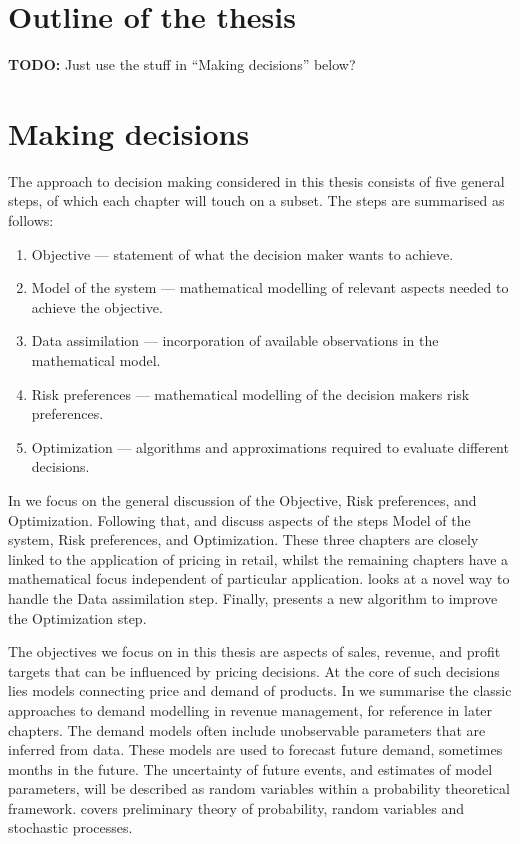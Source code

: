 \documentclass[main.tex]{subfiles}
\begin{document}
\section{Outline of the thesis}
\textbf{TODO:} Just use the stuff in ``Making decisions'' below?

\section{Making decisions}
The approach to decision making considered in this thesis consists of
five general steps, of which each chapter will touch on a subset.
The steps are summarised as follows:
\begin{enumerate}
\item Objective --- statement of what the decision maker wants to achieve.
\item Model of the system --- mathematical modelling of relevant aspects
  needed to achieve the objective.
\item Data assimilation --- incorporation of available observations in
  the mathematical model.
\item Risk preferences --- mathematical modelling of the decision makers risk
  preferences.
\item Optimization --- algorithms and approximations required to
  evaluate different decisions.
\end{enumerate}
In  we focus on the general discussion of the
Objective, Risk preferences, and Optimization.
Following that,  and
 discuss  aspects of the steps Model of the system, Risk
preferences, and Optimization.
These three chapters are closely linked to the application of pricing
in retail, whilst the remaining chapters have a mathematical focus
independent of particular application.
 looks at a novel way to handle the Data
assimilation step. Finally,  presents a new
algorithm to improve the Optimization step.


The objectives we focus on in this thesis are aspects
of sales, revenue, and profit targets that can be influenced by
pricing decisions.
At the core of such decisions lies models connecting price and demand of products.
In  we summarise the classic approaches
to demand modelling in revenue management, for reference in later
chapters.
The demand models often include unobservable parameters that are
inferred from data.
These models are used to forecast future demand, sometimes months in
the future.
The uncertainty of future events, and estimates of model
parameters, will be described as random variables within a probability
theoretical framework.  covers preliminary
theory of probability, random variables and stochastic
processes.
\end{document}
